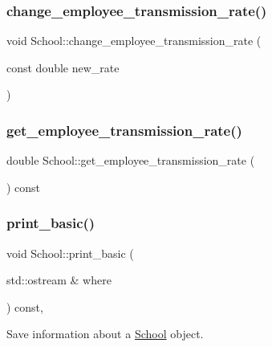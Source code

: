 \subsubsection{\texorpdfstring{change\+\_\+employee\+\_\+transmission\+\_\+rate()}{change\_employee\_transmission\_rate()}}
{\footnotesize\ttfamily void School\+::change\+\_\+employee\+\_\+transmission\+\_\+rate (\begin{DoxyParamCaption}\item[{const double}]{new\+\_\+rate }\end{DoxyParamCaption})\hspace{0.3cm}{\ttfamily [inline]}}

\mbox{\label{classSchool_a7cc6659bce874d0cc56ed45972c7d842}} 
\subsubsection{\texorpdfstring{get\+\_\+employee\+\_\+transmission\+\_\+rate()}{get\_employee\_transmission\_rate()}}
{\footnotesize\ttfamily double School\+::get\+\_\+employee\+\_\+transmission\+\_\+rate (\begin{DoxyParamCaption}{ }\end{DoxyParamCaption}) const\hspace{0.3cm}{\ttfamily [inline]}}

\mbox{\label{classSchool_ade1610f7c072eb041f6d8b0e157e1cc8}} 
\subsubsection{\texorpdfstring{print\+\_\+basic()}{print\_basic()}}
{\footnotesize\ttfamily void School\+::print\+\_\+basic (\begin{DoxyParamCaption}\item[{std\+::ostream \&}]{where }\end{DoxyParamCaption}) const\hspace{0.3cm}{\ttfamily [override]}, {\ttfamily [virtual]}}



Save information about a \hyperlink{classSchool}{School} object. 

